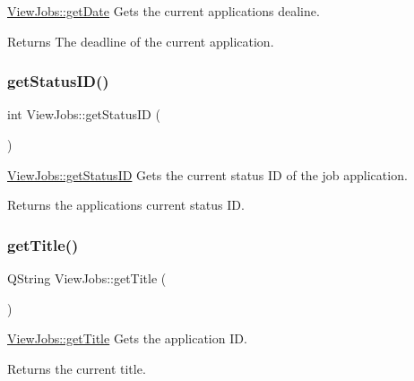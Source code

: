 \hyperlink{class_view_jobs_af046f9201cc6031e070b4f9b613a35f9}{View\+Jobs\+::get\+Date} Gets the current application\textquotesingle{}s dealine. 

\begin{DoxyReturn}{Returns}
The deadline of the current application. 
\end{DoxyReturn}
\mbox{\label{class_view_jobs_a91696fde9f0a663bae929390aac8324b}} 
\subsubsection{\texorpdfstring{get\+Status\+I\+D()}{getStatusID()}}
{\footnotesize\ttfamily int View\+Jobs\+::get\+Status\+ID (\begin{DoxyParamCaption}{ }\end{DoxyParamCaption})}



\hyperlink{class_view_jobs_a91696fde9f0a663bae929390aac8324b}{View\+Jobs\+::get\+Status\+ID} Gets the current status ID of the job application. 

\begin{DoxyReturn}{Returns}
the application\textquotesingle{}s current status ID. 
\end{DoxyReturn}
\mbox{\label{class_view_jobs_ae78f119d37c77a9e3e457ecfd78d7de3}} 
\subsubsection{\texorpdfstring{get\+Title()}{getTitle()}}
{\footnotesize\ttfamily Q\+String View\+Jobs\+::get\+Title (\begin{DoxyParamCaption}{ }\end{DoxyParamCaption})}



\hyperlink{class_view_jobs_ae78f119d37c77a9e3e457ecfd78d7de3}{View\+Jobs\+::get\+Title} Gets the application ID. 

\begin{DoxyReturn}{Returns}
the current title. 
\end{DoxyReturn}
\mbox{\label{class_view_jobs_a5f75b45d28ce7f4a8050ce9ce0f44350}} 
